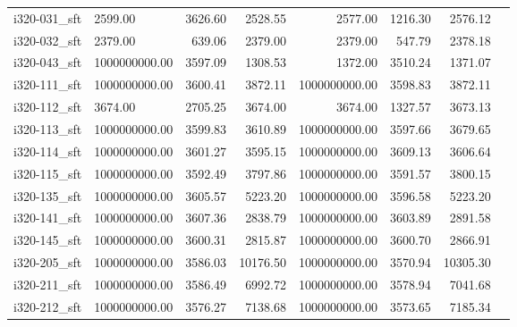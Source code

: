 \begin{tabular}{llrrrrrr}
i320-031\_sft &                 2599.00 &                     3626.60 &               2528.55 &          2577.00 &              1216.30 &        2576.12 \\
i320-032\_sft &                 2379.00 &                      639.06 &               2379.00 &          2379.00 &               547.79 &        2378.18 \\
i320-043\_sft &           1000000000.00 &                     3597.09 &               1308.53 &          1372.00 &              3510.24 &        1371.07 \\
i320-111\_sft &           1000000000.00 &                     3600.41 &               3872.11 &    1000000000.00 &              3598.83 &        3872.11 \\
i320-112\_sft &                 3674.00 &                     2705.25 &               3674.00 &          3674.00 &              1327.57 &        3673.13 \\
i320-113\_sft &           1000000000.00 &                     3599.83 &               3610.89 &    1000000000.00 &              3597.66 &        3679.65 \\
i320-114\_sft &           1000000000.00 &                     3601.27 &               3595.15 &    1000000000.00 &              3609.13 &        3606.64 \\
i320-115\_sft &           1000000000.00 &                     3592.49 &               3797.86 &    1000000000.00 &              3591.57 &        3800.15 \\
i320-135\_sft &           1000000000.00 &                     3605.57 &               5223.20 &    1000000000.00 &              3596.58 &        5223.20 \\
i320-141\_sft &           1000000000.00 &                     3607.36 &               2838.79 &    1000000000.00 &              3603.89 &        2891.58 \\
i320-145\_sft &           1000000000.00 &                     3600.31 &               2815.87 &    1000000000.00 &              3600.70 &        2866.91 \\
i320-205\_sft &           1000000000.00 &                     3586.03 &              10176.50 &    1000000000.00 &              3570.94 &       10305.30 \\
i320-211\_sft &           1000000000.00 &                     3586.49 &               6992.72 &    1000000000.00 &              3578.94 &        7041.68 \\
i320-212\_sft &           1000000000.00 &                     3576.27 &               7138.68 &    1000000000.00 &              3573.65 &        7185.34 \\

\end{tabular}
